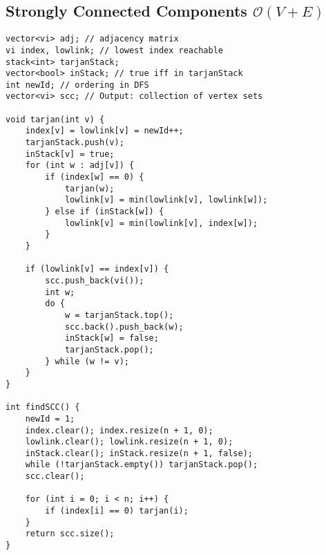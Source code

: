 \documentclass{article}
\begin{document}
\subsection{Strongly Connected Components $\mathcal{O}(V + E)$}

\begin{lstlisting}
vector<vi> adj; // adjacency matrix
vi index, lowlink; // lowest index reachable
stack<int> tarjanStack;
vector<bool> inStack; // true iff in tarjanStack
int newId; // ordering in DFS
vector<vi> scc; // Output: collection of vertex sets

void tarjan(int v) {
	index[v] = lowlink[v] = newId++;
	tarjanStack.push(v);
	inStack[v] = true;
	for (int w : adj[v]) {
		if (index[w] == 0) {
			tarjan(w);
			lowlink[v] = min(lowlink[v], lowlink[w]);
		} else if (inStack[w]) {
			lowlink[v] = min(lowlink[v], index[w]);
		}
	}
	
	if (lowlink[v] == index[v]) {
		scc.push_back(vi());
		int w;
		do {
			w = tarjanStack.top();
			scc.back().push_back(w);
			inStack[w] = false;
			tarjanStack.pop();
		} while (w != v);
	}
}

int findSCC() {
	newId = 1;
	index.clear(); index.resize(n + 1, 0);
	lowlink.clear(); lowlink.resize(n + 1, 0);
	inStack.clear(); inStack.resize(n + 1, false);
	while (!tarjanStack.empty()) tarjanStack.pop();
	scc.clear();

	for (int i = 0; i < n; i++) {
		if (index[i] == 0) tarjan(i);
	}
	return scc.size();
}

\end{lstlisting}

\begin{comment}
\subsection{Cycle Detection $\mathcal{O}(V + E)$}

\begin{lstlisting}
vector<vi> adj; // assumes bidirected graph, adjust accordingly
vector<bool> vis(MAXN, false);
vector<int> par(MAXN, -1);

bool cycle_detection() {
	stack<int> s;
	s.push(0);
	vis[0] = true;
	while(!s.empty()) {
		int cur = s.top();
		s.pop();
		for(int i : adj[cur]) {
			if(vis[i] && par[cur] != i) return true;
			s.push(i);
			par[i] = cur;
			vis[i] = true;
		}
	}
	return false;
} 

\end{lstlisting}
\end{comment}
\end{document}
